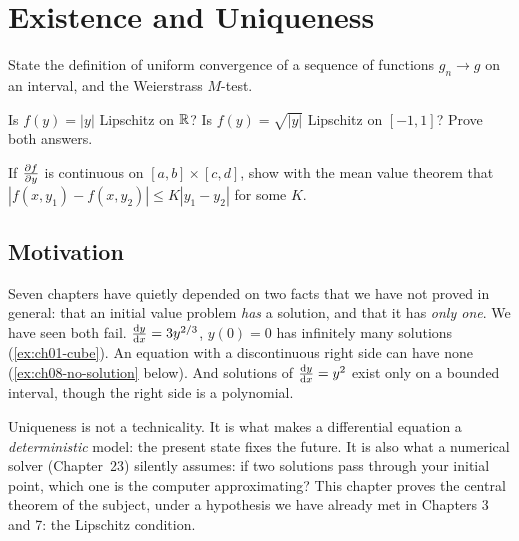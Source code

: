 \chapter{Existence and Uniqueness}\label{ch:ch08}

\begin{diagnostic}
  \item State the definition of uniform convergence of a sequence of functions
        $g_n\to g$ on an interval, and the Weierstrass $M$-test.
  \item Is $f(y) = |y|$ Lipschitz on $\mathbb{R}$? Is $f(y) = \sqrt{|y|}$ Lipschitz on
        $[-1,1]$? Prove both answers.
  \item If $\frac{\partial f}{\partial y}$ is continuous on $[a,b]\times[c,d]$, show with the mean
        value theorem that $|f(x,y_1) - f(x,y_2)|\le K|y_1 - y_2|$ for some $K$.
\end{diagnostic}

\section{Motivation}\label{sec:ch08-motivation}

Seven chapters have quietly depended on two facts that we have not proved in
general: that an initial value problem \emph{has} a solution, and that it has
\emph{only one}. We have seen both fail. $\frac{\mathrm{d}y}{\mathrm{d}x} = 3y^{2/3}$, $y(0) = 0$ has
infinitely many solutions (\cref{ex:ch01-cube}). An equation with a
discontinuous right side can have none (\cref{ex:ch08-no-solution} below). And
solutions of $\frac{\mathrm{d}y}{\mathrm{d}x} = y^2$ exist only on a bounded interval, though the
right side is a polynomial.

Uniqueness is not a technicality. It is what makes a differential equation a
\emph{deterministic} model: the present state fixes the future. It is also what
a numerical solver (Chapter~23) silently assumes: if two solutions pass
through your initial point, which one is the computer approximating? This
chapter proves the central theorem of the subject, under a hypothesis we have
already met in Chapters 3 and 7: the Lipschitz condition.


